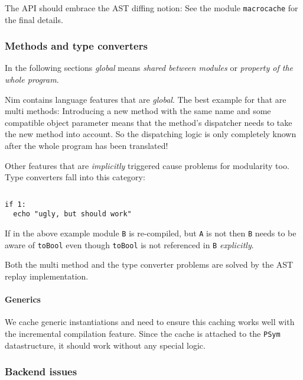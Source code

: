 The API should embrace the AST diffing notion: See the module
\texttt{macrocache} for the final details.

\hypertarget{methods-and-type-converters}{%
\subsubsection{Methods and type
converters}\label{methods-and-type-converters}}

In the following sections \emph{global} means \emph{shared between
modules} or \emph{property of the whole program}.

Nim contains language features that are \emph{global}. The best example
for that are multi methods: Introducing a new method with the same name
and some compatible object parameter means that the method's dispatcher
needs to take the new method into account. So the dispatching logic is
only completely known after the whole program has been translated!

Other features that are \emph{implicitly} triggered cause problems for
modularity too. Type converters fall into this category:

\begin{verbatim}
\end{verbatim}

\begin{verbatim}
if 1:
  echo "ugly, but should work"
\end{verbatim}

If in the above example module \texttt{B} is re-compiled, but \texttt{A}
is not then \texttt{B} needs to be aware of \texttt{toBool} even though
\texttt{toBool} is not referenced in \texttt{B} \emph{explicitly}.

Both the multi method and the type converter problems are solved by the
AST replay implementation.

\hypertarget{generics}{%
\paragraph{Generics}\label{generics}}

We cache generic instantiations and need to ensure this caching works
well with the incremental compilation feature. Since the cache is
attached to the \texttt{PSym} datastructure, it should work without any
special logic.

\hypertarget{backend-issues}{%
\subsubsection{Backend issues}\label{backend-issues}}

